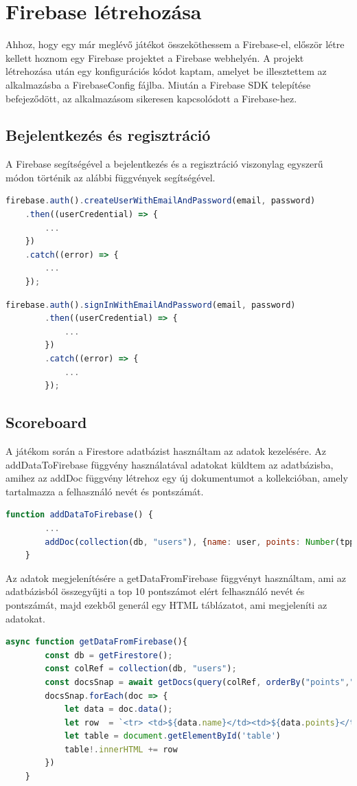 \documentclass[12pt, a4paper]{report}
\theoremstyle{definition}
\begin{document}
	\section{Firebase létrehozása}
	Ahhoz, hogy egy már meglévő játékot összeköthessem a Firebase-el, először létre kellett hoznom egy Firebase projektet a Firebase webhelyén. A projekt létrehozása után egy konfigurációs kódot kaptam, amelyet be illesztettem az alkalmazásba a FirebaseConfig fájlba. Miután a Firebase SDK telepítése befejeződött, az alkalmazásom sikeresen kapcsolódott a Firebase-hez.
	
	\subsection{Bejelentkezés és regisztráció}
	A Firebase segítségével a bejelentkezés és a regisztráció viszonylag egyszerű módon történik az alábbi függvények segítségével.
	
	\begin{lstlisting}[language=JavaScript]
	firebase.auth().createUserWithEmailAndPassword(email, password)
	.then((userCredential) => {
		...
	})
	.catch((error) => {
		...
	});
	\end{lstlisting}
	\begin{lstlisting}[language=JavaScript]
		firebase.auth().signInWithEmailAndPassword(email, password)
		.then((userCredential) => {
			...
		})
		.catch((error) => {
			...
		});
	\end{lstlisting}
	\subsection{Scoreboard}
	A játékom során a Firestore adatbázist használtam az adatok kezelésére. Az addDataToFirebase függvény használatával adatokat küldtem az adatbázisba, amihez az addDoc függvény létrehoz egy új dokumentumot a kollekcióban, amely tartalmazza a felhasználó nevét és pontszámát.
	\begin{lstlisting}[language=JavaScript]
	function addDataToFirebase() {
		...
		addDoc(collection(db, "users"), {name: user, points: Number(tppont)})
	}
	\end{lstlisting}
	Az adatok megjelenítésére a getDataFromFirebase függvényt használtam, ami az adatbázisból összegyűjti a top 10 pontszámot elért felhasználó nevét és pontszámát, majd ezekből generál egy HTML táblázatot, ami megjeleníti az adatokat.

	\begin{lstlisting}[language=JavaScript]
	async function getDataFromFirebase(){
		const db = getFirestore();
		const colRef = collection(db, "users");
		const docsSnap = await getDocs(query(colRef, orderBy("points","desc"), limit(10)));
		docsSnap.forEach(doc => {
			let data = doc.data();
			let row  = `<tr> <td>${data.name}</td><td>${data.points}</td> </tr>`;
			let table = document.getElementById('table')
			table!.innerHTML += row
		})
	}
	\end{lstlisting}
\end{document}

